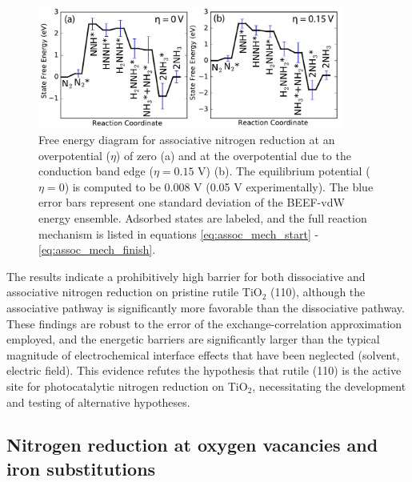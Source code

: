 \documentclass[journal=ascecg,manuscript=article,articletitle=true]{achemso}
\begin{document}
\begin{figure}
\includegraphics[width=0.9\textwidth]{figures/associative_FED.pdf}
\caption{Free energy diagram for associative nitrogen reduction at an overpotential ($\eta$) of zero (a) and at the overpotential due to the conduction band edge ($\eta=0.15$ V) (b). The equilibrium potential ($\eta=0$) is computed to be 0.008 V (0.05 V experimentally). The blue error bars represent one standard deviation of the BEEF-vdW energy ensemble. Adsorbed states are labeled, and the full reaction mechanism is listed in equations \ref{eq:assoc_mech_start} - \ref{eq:assoc_mech_finish}.}
\label{fig:FED_assoc}
\end{figure}

The results indicate a prohibitively high barrier for both dissociative and associative nitrogen reduction on pristine rutile TiO$_2$ (110), although the associative pathway is significantly more favorable than the dissociative pathway. These findings are robust to the error of the exchange-correlation approximation employed, and the energetic barriers are significantly larger than the typical magnitude of electrochemical interface effects that have been neglected (solvent, electric field). This evidence refutes the hypothesis that rutile (110) is the active site for photocatalytic nitrogen reduction on TiO$_2$, necessitating the development and testing of alternative hypotheses.

\subsection{Nitrogen reduction at oxygen vacancies and iron substitutions}
\end{document}
